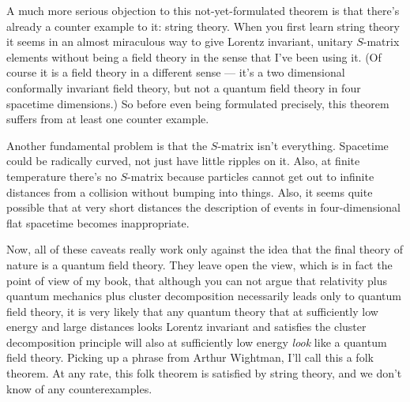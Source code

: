 A much more serious objection to this
not-yet-formulated theorem is that there's already a counter
example to it: string theory.  When you first learn string
theory it seems in an almost miraculous way to give Lorentz
invariant, unitary $S$-matrix elements without being a field
theory in the sense that I've been using it.  (Of course it
is a field theory in a different sense --- it's a two
dimensional conformally invariant field theory, but not a
quantum field theory in four spacetime dimensions.)  So
before even being formulated precisely, this theorem suffers
from at least one counter example.

Another fundamental problem is that the $S$-matrix isn't
everything.  Spacetime could be radically curved, not just
have little ripples on it.  Also, at finite temperature
there's no $S$-matrix because particles cannot get out to
infinite distances from a collision without bumping into
things.  Also, it seems quite possible that at very short
distances the description of events in four-dimensional flat
spacetime becomes inappropriate.

Now, all of these caveats really work only against the idea
that the final theory of nature is a quantum field theory.
They leave open the view, which is in fact the point of view
of my book,  that although you can not argue that relativity
plus quantum mechanics plus cluster decomposition
necessarily leads only to quantum field theory,   it is very
likely that any quantum theory that at sufficiently low
energy and large distances looks Lorentz invariant and
satisfies the cluster decomposition principle  will also at
sufficiently low energy {\em look} like a quantum field
theory.      Picking up a phrase from Arthur Wightman, I'll
call this a folk theorem.  At any rate, this folk theorem is
satisfied by string theory, and we don't know of any
counterexamples.

